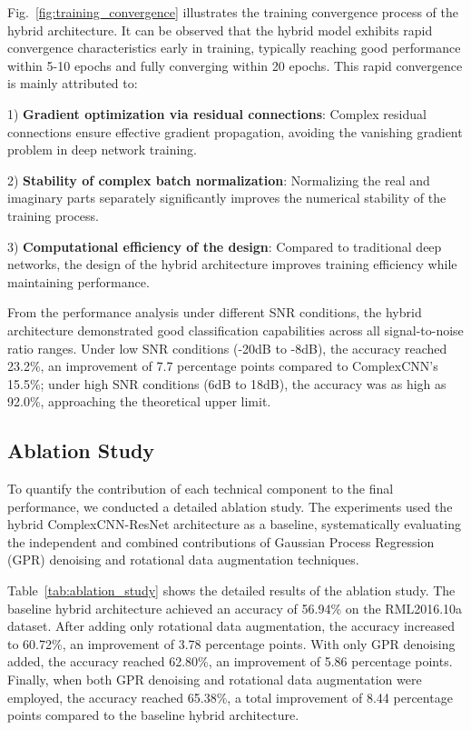 \documentclass[conference]{IEEEtran}
\begin{document}
Fig.~\ref{fig:training_convergence} illustrates the training convergence process of the hybrid architecture. It can be observed that the hybrid model exhibits rapid convergence characteristics early in training, typically reaching good performance within 5-10 epochs and fully converging within 20 epochs. This rapid convergence is mainly attributed to:

1) \textbf{Gradient optimization via residual connections}: Complex residual connections ensure effective gradient propagation, avoiding the vanishing gradient problem in deep network training.

2) \textbf{Stability of complex batch normalization}: Normalizing the real and imaginary parts separately significantly improves the numerical stability of the training process.

3) \textbf{Computational efficiency of the design}: Compared to traditional deep networks, the design of the hybrid architecture improves training efficiency while maintaining performance.

From the performance analysis under different SNR conditions, the hybrid architecture demonstrated good classification capabilities across all signal-to-noise ratio ranges. Under low SNR conditions (-20dB to -8dB), the accuracy reached 23.2\%, an improvement of 7.7 percentage points compared to ComplexCNN's 15.5\%; under high SNR conditions (6dB to 18dB), the accuracy was as high as 92.0\%, approaching the theoretical upper limit.

\subsection{Ablation Study}

To quantify the contribution of each technical component to the final performance, we conducted a detailed ablation study. The experiments used the hybrid ComplexCNN-ResNet architecture as a baseline, systematically evaluating the independent and combined contributions of Gaussian Process Regression (GPR) denoising and rotational data augmentation techniques.

Table~\ref{tab:ablation_study} shows the detailed results of the ablation study. The baseline hybrid architecture achieved an accuracy of 56.94\% on the RML2016.10a dataset. After adding only rotational data augmentation, the accuracy increased to 60.72\%, an improvement of 3.78 percentage points. With only GPR denoising added, the accuracy reached 62.80\%, an improvement of 5.86 percentage points. Finally, when both GPR denoising and rotational data augmentation were employed, the accuracy reached 65.38\%, a total improvement of 8.44 percentage points compared to the baseline hybrid architecture.
\end{document}
